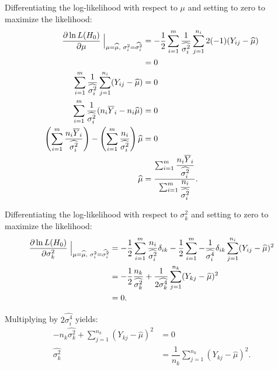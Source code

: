 \documentclass[12pt,a4paper]{article}
\newcommand{\ovY}{\overline{Y}}
\newcommand{\wmu}{\widehat{\mu}}
\newcommand{\wst}[1]{\widehat{\sigma^2_{#1}}}
\newcommand{\wstq}[1]{\widehat{\sigma^4_{#1}}}
\begin{document}
	Differentiating the log-likelihood with respect to $\mu$ and setting to zero to maximize the likelihood:
	\begin{align}
		\dfrac{\partial \ln{L(H_0)}}{\partial \mu} \Bigm\lvert_{\mu = \wmu, \hspace{0.1cm}\sigma^2_i = \wst{i}} &= -\dfrac{1}{2} \sum_{i=1}^m \dfrac{1}{\wst{i}}\sum_{j=1}^{n_i} 2(-1)(Y_{ij}-\wmu) \nonumber\\
		&= 0 \nonumber\\
		\sum_{i=1}^m \dfrac{1}{\wst{i}}\sum_{j=1}^{n_i} (Y_{ij}-\wmu) &= 0 \nonumber\\
		\sum_{i=1}^m \dfrac{1}{\wst{i}} (n_i\ovY_i - n_i \wmu) &= 0 \nonumber\\
		\left(\sum_{i=1}^m \dfrac{n_i \ovY_i}{\wst{i}}\right) - \left(\sum_{i=1}^m \dfrac{n_i}{\wst{i}}\right)\wmu &= 0 \nonumber \\
		\wmu &= \dfrac{\sum_{i=1}^m \dfrac{n_i \ovY_i}{\wst{i}}}{\sum_{i=1}^m \dfrac{n_i}{\wst{i}}}. \label{wmuH0}
	\end{align}

	Differentiating the log-likelihood with respect to $\sigma^2_k$ and setting to zero to maximize the likelihood:
	\begin{align*}
		\dfrac{\partial \ln{L(H_0)}}{\partial \sigma^2_k} \Bigm\lvert_{\mu = \wmu, \hspace{0.1cm} \sigma^2_i = \wst{i}} &= -\dfrac{1}{2} \sum_{i=1}^m \dfrac{n_i}{\wst{i}}\delta_{ik} - \dfrac{1}{2} \sum_{i=1}^m -\dfrac{1}{\wstq{i}} \delta_{ik}\sum_{j=1}^{n_i} (Y_{ij}-\wmu)^2 \\
		&= -\dfrac{1}{2} \dfrac{n_k}{\wst{k}} + \dfrac{1}{2\wstq{k}} \sum_{j=1}^{n_k} (Y_{kj}-\wmu)^2 \\
		&= 0.
	\end{align*}

	Multiplying by $2\wstq{i}$ yields:
	\begin{align}
		-n_k\wst{k} + \sum_{j=1}^{n_k} (Y_{kj}-\wmu)^2 &= 0 \nonumber\\
		\wst{k} &= \dfrac{1}{n_k} \sum_{j=1}^{n_k} (Y_{kj}-\wmu)^2. \label{wstH0}
	\end{align}
\end{document}
